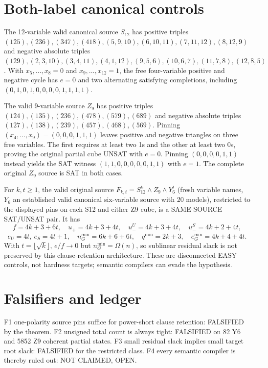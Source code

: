 \documentclass{article}
\begin{document}
\section{Both-label canonical controls}
The 12-variable valid canonical source $S_{12}$ has positive triples $(125),(236),(347),(418),(5,9,10),(6,10,11),(7,11,12),(8,12,9)$ and negative absolute triples $(129),(2,3,10),(3,4,11),(4,1,12),(9,5,6),(10,6,7),(11,7,8),(12,8,5)$. With $x_5,\ldots,x_8=0$ and $x_9,\ldots,x_{12}=1$, the free four-variable positive and negative cycle has $e=0$ and two alternating satisfying completions, including $(0,1,0,1,0,0,0,0,1,1,1,1)$.

The valid 9-variable source $Z_9$ has positive triples $(124),(135),(236),(478),(579),(689)$ and negative absolute triples $(127),(138),(239),(457),(468),(569)$. Pinning $(x_4,\ldots,x_9)=(0,0,0,1,1,1)$ leaves positive and negative triangles on three free variables. The first requires at least two 1s and the other at least two 0s, proving the original partial cube UNSAT with $e=0$. Pinning $(0,0,0,0,1,1)$ instead yields the SAT witness $(1,1,0,0,0,0,0,1,1)$ with $e=1$. The complete original $Z_9$ source is SAT in both cases.

For $k,t\ge1$, the valid original source $F_{k,t}=S_{12}^k\land Z_9\land Y_6^t$ (fresh variable names, $Y_6$ an established valid canonical six-variable source with 20 models), restricted to the displayed pins on each S12 and either Z9 cube, is a SAME-SOURCE SAT/UNSAT pair. It has
\[
f=4k+3+6t,\quad u_+=4k+3+4t,\quad
u_-^U=4k+3+4t,\quad u_-^S=4k+2+4t,
\]
\[
e_U=4t,\ e_S=4t+1,\quad
n_G^{\min}=6k+6+6t,\quad q^{\min}=2k+3,\quad
e_G^{\min}=4k+4+4t.
\]
With $t=\lfloor\sqrt{k}\rfloor$, $e/f\to0$ but $n_G^{\min}=\Omega(n)$, so sublinear residual slack is not preserved by this clause-retention architecture. These are disconnected EASY controls, not hardness targets; semantic compilers can evade the hypothesis.

\section{Falsifiers and ledger}
F1 one-polarity source pins suffice for power-short clause retention: FALSIFIED by the theorem. F2 unsigned total count is always tight: FALSIFIED on 82 Y6 and 5852 Z9 coherent partial states. F3 small residual slack implies small target root slack: FALSIFIED for the restricted class. F4 every semantic compiler is thereby ruled out: NOT CLAIMED, OPEN.
\end{document}
